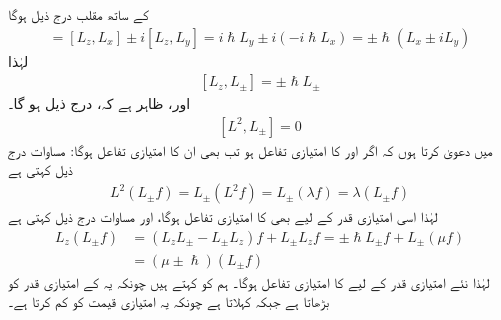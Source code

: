  کے ساتھ مقلب درج ذیل ہوگا 
\begin{align*} 
[L_z, L_{\pm}] = [L_z, L_x] \pm i [L_z, L_y] = i \hslash L_y \pm i (- i \hslash L_x) = \pm \hslash (L_x \pm i L_y)
\end{align*}
لہٰذا 
\begin{align}\label{مساوات_تین_ابعادی_ایک_اور_سیڑھی}
[L_z, L_{\pm}] = \pm \hslash L_{\pm}
\end{align}
اور، ظاہر ہے کہ، درج ذیل ہو گا۔ 
\begin{align}\label{مساوات_تین_ابعادی_مربع_اور_سیڑھی}
[L^2, L_{\pm}] = 0
\end{align}
میں دعویٰ کرتا ہوں کہ اگر  اور  کا امتیازی تفاعل  ہو تب  بھی ان کا امتیازی تفاعل ہوگا: مساوات درج ذیل کہتی ہے 
\begin{align}
L^2 (L_{\pm} f) = L_{\pm} (L^2 f) = L_{\pm} (\lambda f) = \lambda (L_{\pm} f)
\end{align}
لہٰذا اسی امتیازی قدر  کے لیے  بھی  کا امتیازی تفاعل ہوگا، اور مساوات  درج ذیل کہتی ہے 
\begin{align}
L_z (L_{\pm} f) &= (L_z L_{\pm} - L_{\pm} L_z) f + L_{\pm} L_z f = \pm \hslash L_\pm f + L_{\pm} (\mu f) \nonumber \\
&= (\mu \pm \hslash ) (L_{\pm} f)
\end{align}
لہٰذا نئے امتیازی قدر  کے لیے  کا  امتیازی تفاعل ہوگا۔ ہم  کو  کہتے ہیں چونکہ یہ  کے امتیازی قدر کو  بڑھاتا ہے جبکہ   کہلاتا ہے چونکہ یہ امتیازی قیمت کو  کم کرتا ہے۔

